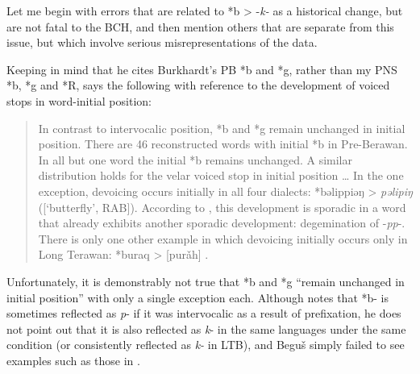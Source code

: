 \documentclass[output=paper]{langscibook}
\begin{document}
Let me begin with errors that are related to *b > -\textit{k-} as a historical change, but are not fatal to the BCH, and then mention others that are separate from this issue, but which involve serious misrepresentations of the data.

Keeping in mind that he cites Burkhardt’s PB *b and *g, rather than my PNS *b, *g and *R, \citet[123]{Beguš2018} says the following with reference to the development of voiced stops in word-initial position:

\begin{quote}
In contrast to intervocalic position, *b and *g remain unchanged in initial position. There are 46 reconstructed words with initial *b in Pre-Berawan. In all but one word the initial *b remains unchanged.  A similar distribution holds for the velar voiced stop in initial position … In the one exception, devoicing occurs initially in all four dialects: *bəlippiəŋ > \textit{pəlipiŋ} ([‘butterfly’, RAB]). According to \citet[144]{Burkhardt2014}, this development is sporadic in a word that already exhibits another sporadic development: degemination of -\textit{pp}-. There is only one other example in which devoicing initially occurs only in Long Terawan: *buraq > [purǎh] \citep{Burkhardt2014}.
\end{quote}

\largerpage
Unfortunately, it is demonstrably not true that *b and *g “remain unchanged in initial position” with only a single exception each. Although \textcite[150ff]{Burkhardt2014} notes that *b- is sometimes reflected as \textit{p}- if it was intervocalic as a result of prefixation, he does not point out that it is also reflected as \textit{k}- in the same languages under the same condition  (or consistently reflected as \textit{k-} in LTB), and Beguš simply failed to see examples such as those in .
\end{document}
